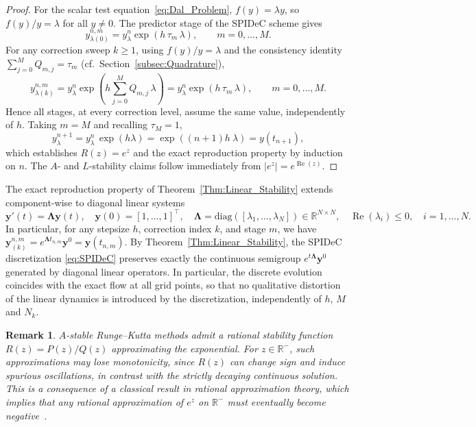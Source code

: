 \documentclass[a4paper,num-refs]{oup-contemporary-spidec}
\newtheorem{remark}[theorem]{Remark}
\begin{document}
\begin{proof}
    For the scalar test equation~\eqref{eq:Dal_Problem}, $f(y)=\lambda y$, 
    so $f(y)/y = \lambda$ for all $y\neq 0$. The predictor 
    stage of the SPIDeC scheme gives
    \begin{equation*}
         y_{\lambda(0)}^{n,m}
        = y_\lambda^n\exp(h\,\tau_m\,\lambda),
        \qquad m=0,\dots,M.
    \end{equation*}
    For any correction sweep $k\geq 1$, using $f(y)/y=\lambda$ 
    and the consistency identity 
    $\sum_{j=0}^M Q_{m,j}=\tau_m$ 
    (cf.\ Section~\ref{subsec:Quadrature}),
    \[
        y_{\lambda(k)}^{n,m}
        = y_\lambda^n\exp\!\left(
            h\sum_{j=0}^M Q_{m,j}\,\lambda
          \right)
        = y_\lambda^n\exp(h\,\tau_m\,\lambda),
        \qquad m=0,\dots,M.
    \]
    Hence all stages, at every correction level, assume the 
    same value, 
    independently of $h$. Taking $m=M$ and recalling $\tau_M=1$,
    \[
        y_\lambda^{n+1}
        = y_\lambda^n\,\exp(h \lambda)
        = \exp((n+1)h \ \lambda)
        = y(t_{n+1}),
    \]
    which establishes $R(z)=e^z$ and the exact reproduction property 
    by induction on $n$. The $A$- and $L$-stability claims follow 
    immediately from $|e^z|=e^{\operatorname{Re}(z)}$.
\end{proof}
The exact reproduction property of Theorem~\ref{Thm:Linear_Stability} extends component-wise to diagonal linear systems
\begin{equation}\label{eq:Diag_Lin_Sys}
    \bm{y}'(t)= \bm{\Lambda} \bm{y}(t), \quad \bm{y}(0)=[1,\dots,1]^\top,  \quad \bm{\Lambda} = \mathrm{diag}([\lambda_1,\dots,\lambda_N])\in\mathbb{R}^{N\times N}, \quad \operatorname{Re}(\lambda_i)\leq 0, \quad  i=1,\dots,N.
\end{equation}
In particular, for any stepsize $h$, correction index $k$, and stage $m$, we have $\bm{y}_{(k)}^{n,m} = e^{\bm{\Lambda} t_{n,m}} \bm{y}^0 = \bm{y}(t_{n,m}).$ By Theorem~\ref{Thm:Linear_Stability}, the SPIDeC discretization \eqref{eq:SPIDeC} preserves exactly the continuous semigroup $e^{t\bm{\Lambda}}\bm{y}^0$ generated by diagonal linear operators. In particular, the discrete evolution coincides with the exact flow at all grid points, so that no qualitative distortion of the linear dynamics is introduced by the discretization, independently of $h$, $M$ and $N_k$.

\begin{remark}
    $A$-stable Runge--Kutta methods admit a rational stability function $R(z)=P(z)/Q(z)$ approximating the exponential. 
    For $z\in\mathbb{R}^-$, such approximations may lose monotonicity, since $R(z)$ can change sign and induce spurious oscillations, in contrast with the strictly decaying continuous solution. 
    This is a consequence of a classical result in rational approximation theory, which implies that any rational approximation of $e^z$ on $\mathbb{R}^-$ must eventually become negative~\cite{Iserles_2009}.
\end{remark}
\end{document}
